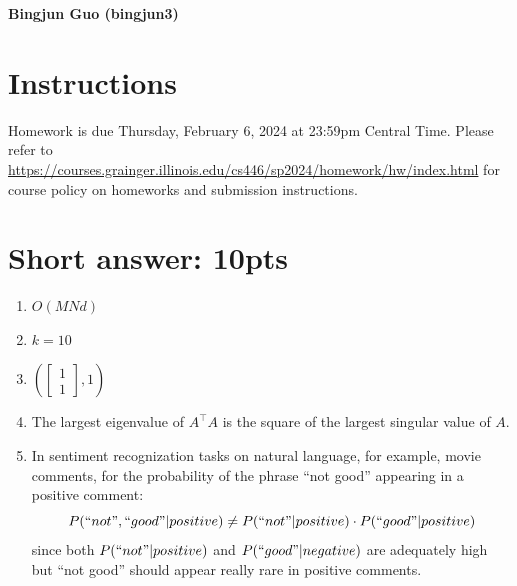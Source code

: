 \documentclass[12pt]{article}
\begin{document}
\singlespacing
\textbf{Bingjun Guo (bingjun3)}

\renewcommand{\familydefault}{\rmdefault}


\section{Instructions}
Homework is due Thursday, February 6, 2024 at 23:59pm Central Time.
Please refer to \url{https://courses.grainger.illinois.edu/cs446/sp2024/homework/hw/index.html} for course policy on homeworks and submission instructions.

\section{Short answer: 10pts}
\begin{enumerate}
\item $O(MNd)$
\item $k=10$
\item $
    \left(\begin{bmatrix}
        1 \\ 1
        \end{bmatrix}, 1
    \right)$
\item The largest eigenvalue of $A^\top A$ is the square of the largest singular value of $A$.
\item In sentiment recognization tasks on natural language, for example, movie comments, for 
the probability of the phrase ``not good'' appearing in a positive comment:
\[P(``not", ``good"|positive) \neq P(``not"|positive) \cdot P(``good"|positive)\]
since both $P(``not"|positive)$ and $P(``good"|negative)$ are adequately high but 
``not good'' should appear really rare in positive comments.
\end{enumerate}

\end{document}
